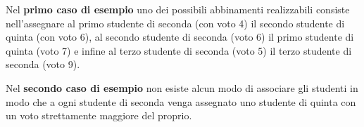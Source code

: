 

\Examples

\begin{example}
%
%
\end{example}


\Explanation

Nel \textbf{primo caso di esempio} uno dei possibili abbinamenti realizzabili consiste nell'assegnare al primo studente di seconda (con voto 4) il secondo studente di quinta (con voto 6), al secondo studente di seconda (voto 6) il primo studente di quinta (voto 7) e infine al terzo studente di seconda (voto 5) il terzo studente di seconda (voto 9).

Nel \textbf{secondo caso di esempio} non esiste alcun modo di associare gli studenti in modo che a ogni studente di seconda venga assegnato uno studente di quinta con un voto strettamente maggiore del proprio.
